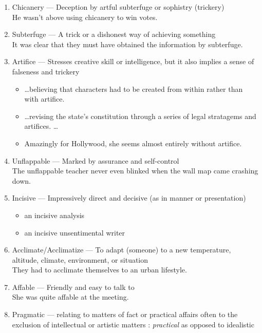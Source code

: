 \documentclass[oneside]{book}
\begin{document}
\begin{enumerate}
        \item Chicanery --- Deception by artful subterfuge or sophistry (trickery)\\
    \footnotesize He wasn't above using chicanery to win votes. \normalsize    
    \item Subterfuge --- A trick or a dishonest way of achieving something\\
    \footnotesize It was clear that they must have obtained the information by subterfuge. \normalsize
    \item Artifice --- Stresses creative skill or intelligence, but it also implies a sense of falseness and trickery
    \footnotesize
    \begin{itemize}
        \item \ldots believing that characters had to be created from within rather than with artifice.
        \item \ldots revising the state's constitution through a series of legal stratagems and artifices. \ldots
        \item Amazingly for Hollywood, she seems almost entirely without artifice.
    \end{itemize} \normalsize
    \item Unflappable --- Marked by assurance and self-control\\
    \footnotesize The unflappable teacher never even blinked when the wall map came crashing down. \normalsize
    \item Incisive --- Impressively direct and decisive (as in manner or presentation) \footnotesize
    \begin{itemize}
        \item an incisive analysis
        \item an incisive unsentimental writer
    \end{itemize} \normalsize
    \item Acclimate/Acclimatize --- To adapt (someone) to a new temperature, altitude, climate, environment, or situation\\
    \footnotesize They had to acclimate themselves to an urban lifestyle. \normalsize
    \item Affable --- Friendly and easy to talk to\\  
    \footnotesize She was quite affable at the meeting. \normalsize
    \item Pragmatic --- relating to matters of fact or practical affairs often to the exclusion of intellectual or artistic matters : \emph{practical} as opposed to idealistic

\end{enumerate}
\end{document}
